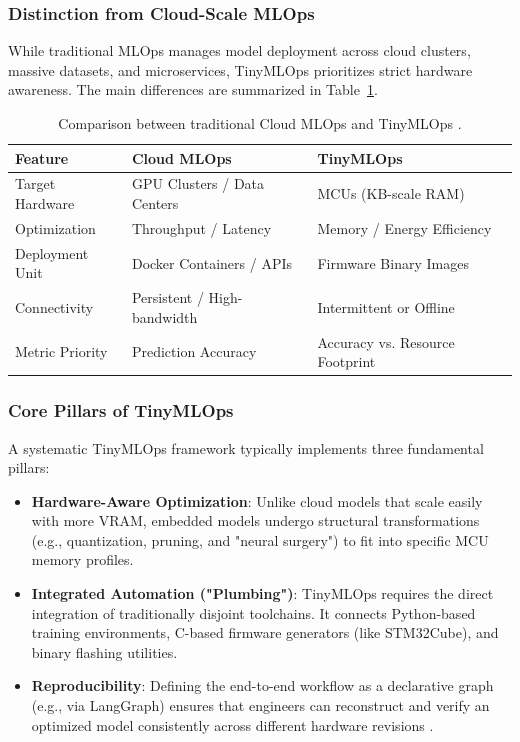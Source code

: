 \subsubsection{Distinction from Cloud-Scale MLOps}

While traditional MLOps manages model deployment across cloud clusters, massive datasets, and microservices, TinyMLOps prioritizes strict hardware awareness. The main differences are summarized in Table~\ref{tab:mlops_vs_tinymlops}.

\begin{table}[h]
    \centering
    \caption{Comparison between traditional Cloud MLOps and TinyMLOps \cite{mlops_productivity_2024}.}
    \label{tab:mlops_vs_tinymlops}
    \begin{tabular}{|l|l|l|}
        \hline
        \textbf{Feature} & \textbf{Cloud MLOps}        & \textbf{TinyMLOps}              \\
        \hline
        Target Hardware  & GPU Clusters / Data Centers & MCUs (KB-scale RAM)             \\
        Optimization     & Throughput / Latency        & Memory / Energy Efficiency      \\
        Deployment Unit  & Docker Containers / APIs    & Firmware Binary Images          \\
        Connectivity     & Persistent / High-bandwidth & Intermittent or Offline         \\
        Metric Priority  & Prediction Accuracy         & Accuracy vs. Resource Footprint \\
        \hline
    \end{tabular}
\end{table}

\subsubsection{Core Pillars of TinyMLOps}

A systematic TinyMLOps framework typically implements three fundamental pillars:

\begin{itemize}
    \item \textbf{Hardware-Aware Optimization}: Unlike cloud models that scale easily with more VRAM, embedded models undergo structural transformations (e.g., quantization, pruning, and "neural surgery") to fit into specific MCU memory profiles.

    \item \textbf{Integrated Automation ("Plumbing")}: TinyMLOps requires the direct integration of traditionally disjoint toolchains. It connects Python-based training environments, C-based firmware generators (like STM32Cube), and binary flashing utilities.

    \item \textbf{Reproducibility}: Defining the end-to-end workflow as a declarative graph (e.g., via LangGraph) ensures that engineers can reconstruct and verify an optimized model consistently across different hardware revisions \cite{wang2024agentailanggraphmodular}.
\end{itemize}

